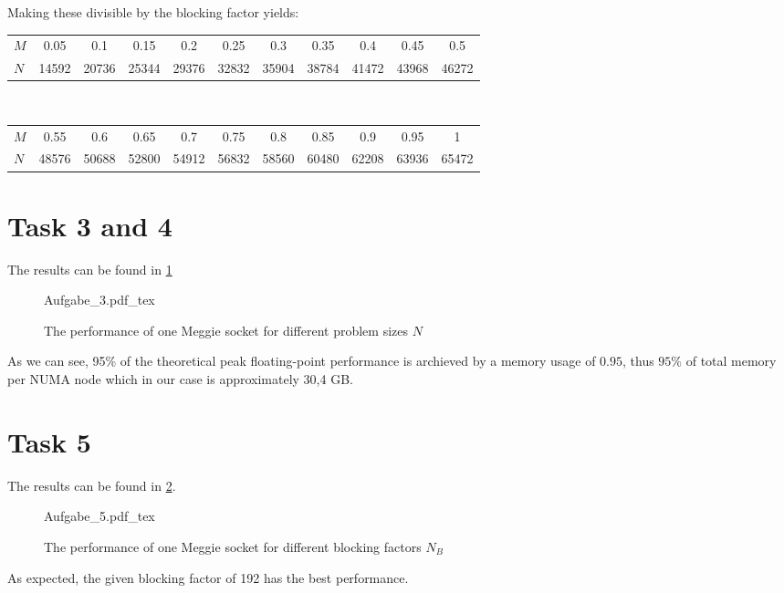 \documentclass[a4paper,12pt,DIV=15, english, parskip=half]{scrartcl}  %
\newcommand{\inkfig}[2][\columnwidth]{%
    \def\svgwidth{#1}
    {#2.pdf_tex}
}
\numberwithin{equation}{section}
\begin{document}
Making these divisible by the blocking factor yields:

\begin{tabular}{lcccccccccc}
  \toprule
  \(M\) & 0.05 & 0.1 & 0.15 & 0.2 & 0.25 & 0.3 & 0.35 & 0.4 & 0.45 & 0.5\\
  \(N\) & 14592 & 20736 & 25344 & 29376 & 32832 & 35904 & 38784 & 41472 & 43968 & 46272 \\
\bottomrule
\end{tabular}\\
\begin{tabular}{lcccccccccc}
  \toprule
  \(M\) & 0.55 & 0.6 & 0.65 & 0.7 & 0.75 & 0.8 & 0.85 & 0.9 & 0.95 & 1 \\
  \(N\) & 48576 & 50688 & 52800 & 54912 & 56832 & 58560 & 60480 & 62208 & 63936 & 65472
 \\
\bottomrule
\end{tabular}

\section*{Task 3 and 4}
\label{sec:task-3-4}

The results can be found in \cref{fig:aufgabe-3}

\begin{figure}[h!]
  \centering
  \inkfig[0.9\linewidth]{Aufgabe_3}
  \caption{The performance of one Meggie socket for different problem sizes $N$ }
  \label{fig:aufgabe-3}
\end{figure}

As we can see, 95\% of the theoretical peak floating-point performance is archieved by a memory usage of \(0.95\), thus \(95\%\) of total memory per NUMA node which in our case is approximately 30,4 GB. %

\section*{Task 5}
\label{sec:task-5}

The results can be found in \cref{fig:aufgabe-5}.

\begin{figure}[h!]
  \centering
  \inkfig[0.9\linewidth]{Aufgabe_5}
  \caption{The performance of one Meggie socket for different blocking factors $N_B$}
  \label{fig:aufgabe-5}
\end{figure}

As expected, the given blocking factor of 192 has the best performance.
\end{document}
